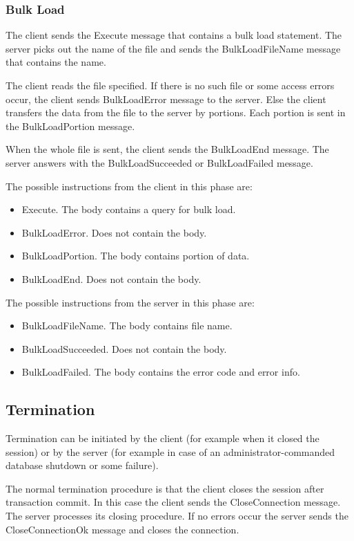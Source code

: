 \documentclass[a4paper,12pt]{article}
\begin{document}
\subsubsection{Bulk Load}

The client sends the Execute message that contains a bulk load statement. The server picks out the name of the file and sends the BulkLoadFileName message that contains the name.

The client reads the file specified. If there is no such file or some access errors occur, the client sends BulkLoadError message to the server. Else the client transfers the data from the file to the server by portions. Each portion is sent in the BulkLoadPortion message.

When the whole file is sent, the client sends the BulkLoadEnd message. The server answers with the BulkLoadSucceeded or BulkLoadFailed message.

The possible instructions from the client in this phase are:
\begin{itemize}
\item Execute. The body contains a query for bulk load.
\item BulkLoadError. Does not contain the body.    
\item BulkLoadPortion. The body contains portion of data.
\item BulkLoadEnd. Does not contain the body.
\end{itemize}

The possible instructions from the server in this phase are:
\begin{itemize}
\item BulkLoadFileName. The body contains file name.
\item BulkLoadSucceeded. Does not contain the body.
\item BulkLoadFailed. The body contains the error code and error info.
\end{itemize}

\subsection{Termination}
Termination can be initiated by the client (for example when it closed the session) or by the server (for example in case of an administrator-commanded database shutdown or some failure). 

The normal termination procedure is that the client closes the session after transaction commit. In this case the client sends the CloseConnection message. The server processes its closing procedure. If no errors occur the server sends the CloseConnectionOk message and closes the connection.
\end{document}
